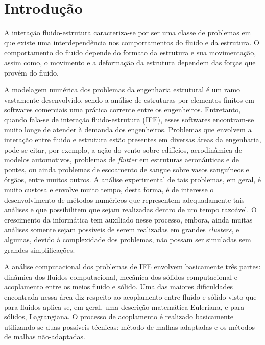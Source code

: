 \documentclass[tese_patricia.tex]{subfiles}
\begin{document}
\chapter[Introdução]{Introdução}\label{capitulo:introducao}

A interação fluido-estrutura caracteriza-se por ser uma classe de problemas em que existe uma interdependência nos comportamentos do fluido e da estrutura. O comportamento do fluido depende do formato da estrutura e sua movimentação, assim como, o movimento e a deformação da estrutura dependem das forças que provém do fluido.

A modelagem numérica dos problemas da engenharia estrutural é um ramo vastamente desenvolvido, sendo a análise de estruturas por elementos finitos em softwares comerciais uma prática corrente entre os engenheiros. Entretanto, quando fala-se de interação fluido-estrutura (IFE), esses softwares encontram-se muito longe de atender à demanda dos engenheiros.
Problemas que envolvem a interação entre fluido e estrutura estão presentes em diversas áreas da engenharia, pode-se citar, por exemplo, a ação do vento sobre edifícios, aerodinâmica de modelos automotivos, problemas de \textit{flutter} em estruturas aeronáuticas e de pontes, ou ainda problemas de escoamento de sangue sobre vasos sanguíneos e órgãos, entre muitos outros. A análise experimental de tais problemas, em geral, é muito custosa e envolve muito tempo, desta forma, é de interesse o desenvolvimento de métodos numéricos que representem adequadamente tais análises e que possibilitem que sejam realizadas dentro de um tempo razoável. O crescimento da informática tem auxiliado nesse processo, embora, ainda muitas análises somente sejam possíveis de serem realizadas em grandes \textit{clusters}, e algumas, devido à complexidade dos problemas, não possam ser simuladas sem grandes simplificações.

A análise computacional dos problemas de IFE envolvem basicamente três partes: dinâmica dos fluidos computacional, mecânica dos sólidos computacional e acoplamento entre os meios fluido e sólido. Uma das maiores dificuldades encontrada nessa área diz respeito ao acoplamento entre fluido e sólido visto que para fluidos aplica-se, em geral, uma descrição matemática Euleriana, e para sólidos, Lagrangiana. O processo de acoplamento é realizado basicamente utilizando-se duas possíveis técnicas: método de malhas adaptadas e os métodos de malhas não-adaptadas. 
\end{document}
